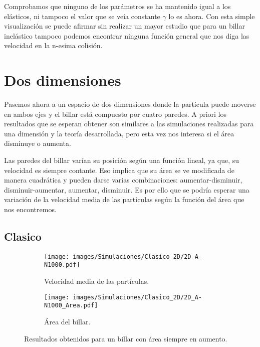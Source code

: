 \documentclass[11pt, spanish]{book}
\begin{document}
\vspace{3mm}

Comprobamos que ninguno de los parámetros se ha mantenido igual a los elásticos, ni tampoco el valor que se veía constante \( \gamma \) lo es ahora. Con esta simple visualización se puede afirmar sin realizar un mayor estudio que para un billar inelástico tampoco podemos encontrar ninguna función general que nos diga las velocidad en la n-esima colisión. 


\section{Dos dimensiones}

Pasemos ahora a un espacio de dos dimensiones donde la partícula puede moverse en ambos ejes y el billar está compuesto por cuatro paredes. A priori los resultados que se esperan obtener son similares a las simulaciones realizadas para una dimensión y la teoría desarrollada, pero esta vez nos interesa si el área disminuye o aumenta.

\vspace{3mm}

Las paredes del billar varían su posición según una función lineal, ya que, su velocidad es siempre contante. Eso implica que su área se ve modificada de manera cuadrática y pueden darse varias combinaciones: aumentar-disminuir, disminuir-aumentar, aumentar, disminuir. Es por ello que se podría esperar una variación de la velocidad media de las partículas según la función del área que nos encontremos. 

\subsection{Clasico}

\begin{figure}[H]
    \begin{subfigure}[b]{0.5\textwidth}
        \centering
        \texttt{[image: images/Simulaciones/Clasico\_2D/2D\_A-N1000.pdf]}
        \caption{Velocidad media de las partículas.}
    \end{subfigure}
    \hfill
    \begin{subfigure}[b]{0.5\textwidth}
        \centering
        \texttt{[image: images/Simulaciones/Clasico\_2D/2D\_A-N1000\_Area.pdf]}
        \caption{Área del billar.}
    \end{subfigure}
    \caption{Resultados obtenidos para un billar con área siempre en aumento.}
    \label{fig:2D_A-N1000_con_Area}
\end{figure}
\end{document}
